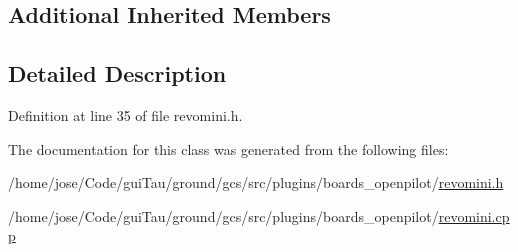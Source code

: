\subsection*{Additional Inherited Members}


\subsection{Detailed Description}


Definition at line 35 of file revomini.\-h.



The documentation for this class was generated from the following files\-:\begin{DoxyCompactItemize}
\item 
/home/jose/\-Code/gui\-Tau/ground/gcs/src/plugins/boards\-\_\-openpilot/\hyperlink{revomini_8h}{revomini.\-h}\item 
/home/jose/\-Code/gui\-Tau/ground/gcs/src/plugins/boards\-\_\-openpilot/\hyperlink{revomini_8cpp}{revomini.\-cpp}\end{DoxyCompactItemize}
